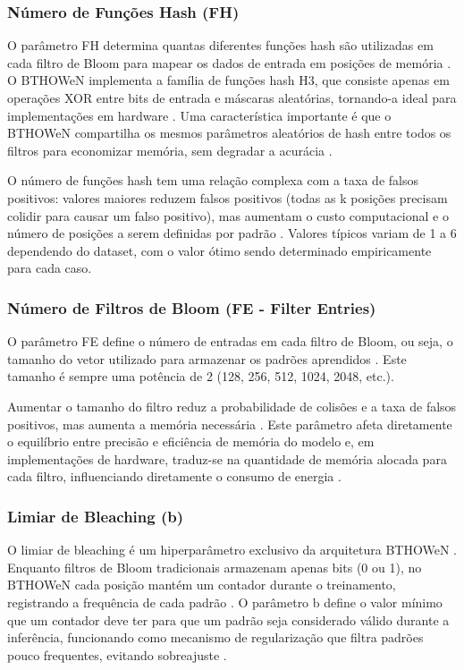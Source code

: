 \documentclass{article}
\begin{document}
\subsubsection{Número de Funções Hash (FH)}

O parâmetro FH determina quantas diferentes funções hash são utilizadas em cada filtro de Bloom para mapear os dados de entrada em posições de memória \cite{santiago2020}. O BTHOWeN implementa a família de funções hash H3, que consiste apenas em operações XOR entre bits de entrada e máscaras aleatórias, tornando-a ideal para implementações em hardware \cite{susskind2022}. Uma característica importante é que o BTHOWeN compartilha os mesmos parâmetros aleatórios de hash entre todos os filtros para economizar memória, sem degradar a acurácia \cite{santiago2020}.

O número de funções hash tem uma relação complexa com a taxa de falsos positivos: valores maiores reduzem falsos positivos (todas as k posições precisam colidir para causar um falso positivo), mas aumentam o custo computacional e o número de posições a serem definidas por padrão \cite{santiago2020}. Valores típicos variam de 1 a 6 dependendo do dataset, com o valor ótimo sendo determinado empiricamente para cada caso.

\subsubsection{Número de Filtros de Bloom (FE - Filter Entries)}

O parâmetro FE define o número de entradas em cada filtro de Bloom, ou seja, o tamanho do vetor utilizado para armazenar os padrões aprendidos \cite{santiago2020}. Este tamanho é sempre uma potência de 2 (128, 256, 512, 1024, 2048, etc.).

Aumentar o tamanho do filtro reduz a probabilidade de colisões e a taxa de falsos positivos, mas aumenta a memória necessária \cite{santiago2020, susskind2022}. Este parâmetro afeta diretamente o equilíbrio entre precisão e eficiência de memória do modelo e, em implementações de hardware, traduz-se na quantidade de memória alocada para cada filtro, influenciando diretamente o consumo de energia \cite{susskind2022}.

\subsubsection{Limiar de Bleaching (b)}

O limiar de bleaching é um hiperparâmetro exclusivo da arquitetura BTHOWeN \cite{santiago2020}. Enquanto filtros de Bloom tradicionais armazenam apenas bits (0 ou 1), no BTHOWeN cada posição mantém um contador durante o treinamento, registrando a frequência de cada padrão \cite{santiago2020, lusquino2020}. O parâmetro b define o valor mínimo que um contador deve ter para que um padrão seja considerado válido durante a inferência, funcionando como mecanismo de regularização que filtra padrões pouco frequentes, evitando sobreajuste \cite{carvalho2013bleaching}.
\end{document}
